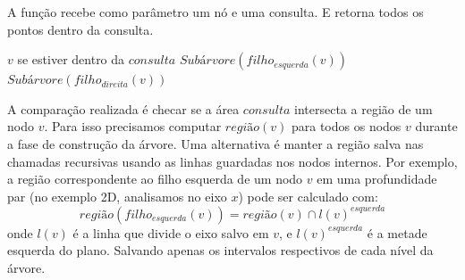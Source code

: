 \begin{algorithm}
    \caption{A função  recebe como parâmetro um nó e uma consulta. E retorna todos os pontos
     dentro da consulta.}
    \begin{algorithmic}[1]
        \Return  $v$ se estiver dentro da $consulta$
        \Else
            \State \Return $Subárvore( filho_{esquerda}(v) )$
            \Else
                \State {}
                \EndIf
            \EndIf
            \State \Return $Subárvore(filho_{direita}(v))$
            \Else
                \State {}
                \EndIf
            \EndIf
        \EndIf
    \EndFunction
    \end{algorithmic}
\end{algorithm}

A comparação realizada é checar se a área \(consulta\) intersecta a região
de um nodo \(v\). Para isso precisamos computar \(região(v)\) para todos os nodos \(v\)
durante a fase de construção da árvore.
Uma alternativa é manter a região salva nas chamadas recursivas usando as linhas guardadas
nos nodos internos. Por exemplo, a região correspondente ao filho esquerda de um nodo
\(v\) em uma profundidade par (no exemplo 2D, analisamos no eixo \(x\)) pode ser calculado com:
\[
    região(filho_{esquerda}(v)) = região(v) \cap l(v)^{esquerda}
\]
onde \(l(v)\) é a linha que divide o eixo salvo em \(v\), e \(l(v)^{esquerda}\) é a metade
esquerda do plano.
Salvando apenas os intervalos respectivos de cada nível da árvore. 

